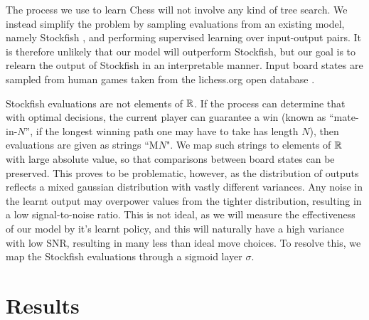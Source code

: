 The process we use to learn Chess will not involve any kind of tree search. We instead simplify the problem by sampling evaluations from an existing model, namely Stockfish \cite{stockfish}, and performing supervised learning over input-output pairs. It is therefore unlikely that our model will outperform Stockfish, but our goal is to relearn the output of Stockfish in an interpretable manner. Input board states are sampled from human games taken from the lichess.org open database \cite{lichess}. 

Stockfish evaluations are not elements of $\mathbb{R}$. If the process can determine that with optimal decisions, the current player can guarantee a win (known as ``mate-in-$N$'', if the longest winning path one may have to take has length $N$), then evaluations are given as strings ``M$N$". We map such strings to elements of $\mathbb{R}$ with large absolute value, so that comparisons between board states can be preserved. This proves to be problematic, however, as the distribution of outputs reflects a mixed gaussian distribution with vastly different variances. Any noise in the learnt output may overpower values from the tighter distribution, resulting in a low signal-to-noise ratio. This is not ideal, as we will measure the effectiveness of our model by it's learnt policy, and this will naturally have a high variance with low SNR, resulting in many less than ideal move choices. To resolve this, we map the Stockfish evaluations through a sigmoid layer $\sigma$.

\section{Results}



